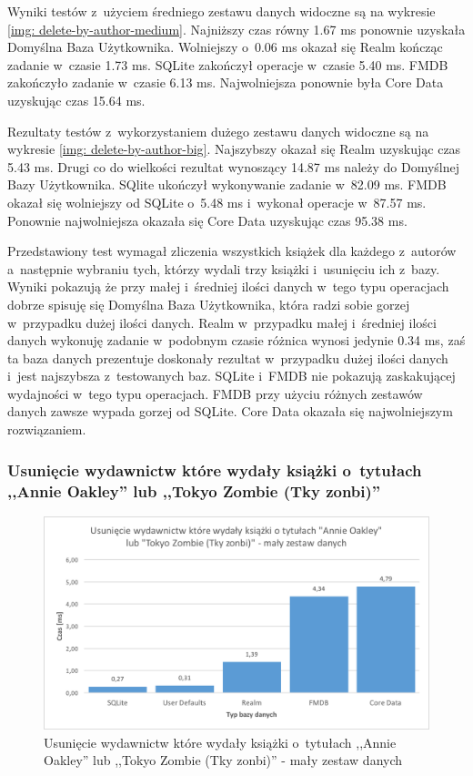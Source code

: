 Wyniki testów z~użyciem średniego zestawu danych widoczne są na wykresie \ref{img: delete-by-author-medium}. Najniższy czas równy 1.67 ms ponownie uzyskała Domyślna Baza Użytkownika. Wolniejszy o~0.06 ms okazał się Realm kończąc zadanie w~czasie 1.73 ms. SQLite zakończył operacje w~czasie 5.40 ms. FMDB zakończyło zadanie w~czasie 6.13 ms. Najwolniejsza ponownie była Core Data uzyskując czas 15.64 ms.

Rezultaty testów z~wykorzystaniem dużego zestawu danych widoczne są na wykresie \ref{img: delete-by-author-big}. Najszybszy okazał się Realm uzyskując czas 5.43 ms. Drugi co do wielkości rezultat wynoszący 14.87 ms należy do Domyślnej Bazy Użytkownika. SQlite ukończył wykonywanie zadanie w~82.09 ms. FMDB okazał się wolniejszy od SQLite o~5.48 ms i~wykonał operacje w~87.57 ms. Ponownie najwolniejsza okazała się Core Data uzyskując czas 95.38 ms.

Przedstawiony test wymagał zliczenia wszystkich książek dla każdego z~autorów a~następnie wybraniu tych, którzy wydali trzy książki i~usunięciu ich z~bazy. Wyniki pokazują że przy małej i~średniej ilości danych w~tego typu operacjach dobrze spisuję się Domyślna Baza Użytkownika, która radzi sobie gorzej w~przypadku dużej ilości danych. Realm w~przypadku małej i~średniej ilości danych wykonuję zadanie w~podobnym czasie różnica wynosi jedynie 0.34 ms, zaś ta baza danych prezentuje doskonały rezultat w~przypadku dużej ilości danych i~jest najszybsza z~testowanych baz. SQLite i~FMDB nie pokazują zaskakującej wydajności w~tego typu operacjach. FMDB przy użyciu różnych zestawów danych zawsze wypada gorzej od SQLite. Core Data okazała się najwolniejszym rozwiązaniem.

\subsubsection{Usunięcie wydawnictw które wydały książki o~tytułach ,,Annie Oakley'' lub ,,Tokyo Zombie (Tky zonbi)''}

\begin{figure}[H]
    \centering\includegraphics[width=\linewidth]{img/delete_data/delete_by_publisher/delete_by_publisher_small_test.png}
    \caption{Usunięcie wydawnictw które wydały książki o~tytułach ,,Annie Oakley'' lub ,,Tokyo Zombie (Tky zonbi)'' - mały zestaw danych}
    \label{img: delete-by-publisher-small}
\end{figure}

